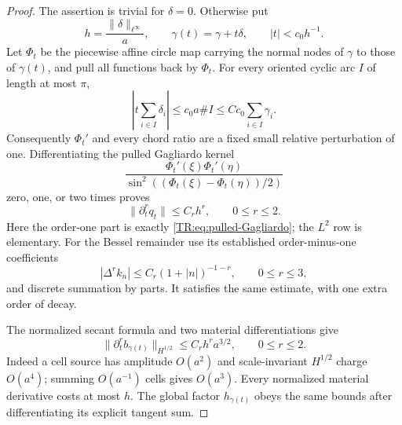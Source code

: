 \begin{proof}
The assertion is trivial for $\delta=0$.  Otherwise put
\begin{equation}\label{TR:eq:material-h}
 h=\frac{\|\delta\|_{\ell^\infty}}a,
 \qquad \gamma(t)=\gamma+t\delta,
 \qquad |t|<c_0h^{-1}.
\end{equation}
Let $\Phi_t$ be the piecewise affine circle map carrying the normal nodes
of $\gamma$ to those of $\gamma(t)$, and pull all functions back by
$\Phi_t$.  For every oriented cyclic arc $I$ of length at most $\pi$,
\begin{equation}\label{TR:eq:arc-material}
 \left|t\sum_{i\in I}\delta_i\right|
 \le c_0a\# I\le Cc_0\sum_{i\in I}\gamma_i.
\end{equation}
Consequently $\Phi_t'$ and every chord ratio are a fixed small relative
perturbation of one.  Differentiating the pulled Gagliardo kernel
\begin{equation}\label{TR:eq:pulled-Gagliardo}
 \frac{\Phi_t'(\xi)\Phi_t'(\eta)}
 {\sin^2((\Phi_t(\xi)-\Phi_t(\eta))/2)}
\end{equation}
zero, one, or two times proves
\begin{equation}\label{TR:eq:form-material}
 \|\partial_t^rq_t\|\le C_rh^r,\qquad 0\le r\le2.
\end{equation}
Here the order-one part is exactly \eqref{TR:eq:pulled-Gagliardo}; the
$L^2$ row is elementary.  For the Bessel remainder use its established
order-minus-one coefficients
\begin{equation}\label{TR:eq:Bessel-differences}
 |\Delta^rk_n|\le C_r(1+|n|)^{-1-r},\qquad 0\le r\le3,
\end{equation}
and discrete summation by parts.  It satisfies the same estimate, with
one extra order of decay.

The normalized secant formula and two material differentiations give
\begin{equation}\label{TR:eq:source-material}
 \|\partial_t^rb_{\gamma(t)}\|_{H^{1/2}}
 \le C_rh^ra^{3/2},\qquad 0\le r\le2.
\end{equation}
Indeed a cell source has amplitude $O(a^2)$ and scale-invariant
$H^{1/2}$ charge $O(a^4)$; summing $O(a^{-1})$ cells gives $O(a^3)$.
Every normalized material derivative costs at most $h$.  The global
factor $h_{\gamma(t)}$ obeys the same bounds after differentiating its
explicit tangent sum.


\end{proof}
